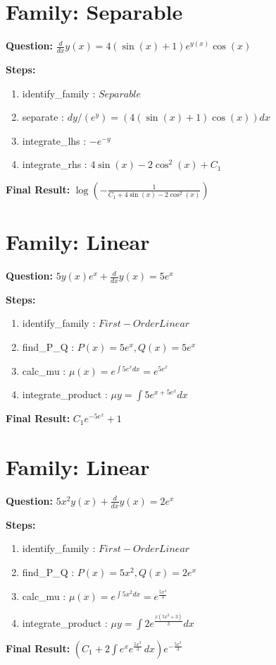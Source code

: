 \documentclass{article}
\begin{document}
\section*{Family: Separable}
\textbf{Question:} $\frac{d}{d x} y{\left(x \right)} = 4 \left(\sin{\left(x \right)} + 1\right) e^{y{\left(x \right)}} \cos{\left(x \right)}$

\textbf{Steps:}
\begin{enumerate}
\item identify_family :  $Separable$
\item separate :  $dy / (e^{y}) = (4 \left(\sin{\left(x \right)} + 1\right) \cos{\left(x \right)}) dx$
\item integrate_lhs :  $- e^{- y}$
\item integrate_rhs :  $4 \sin{\left(x \right)} - 2 \cos^{2}{\left(x \right)} + C_1$
\end{enumerate}
\textbf{Final Result:} $\log{\left(- \frac{1}{C_{1} + 4 \sin{\left(x \right)} - 2 \cos^{2}{\left(x \right)}} \right)}$

\section*{Family: Linear}
\textbf{Question:} $5 y{\left(x \right)} e^{x} + \frac{d}{d x} y{\left(x \right)} = 5 e^{x}$

\textbf{Steps:}
\begin{enumerate}
\item identify_family :  $First-Order Linear$
\item find_P_Q :  $P(x)=5 e^{x}, Q(x)=5 e^{x}$
\item calc_mu :  $\mu(x) = e^{\int 5 e^{x} dx} = e^{5 e^{x}}$
\item integrate_product :  $\mu y = \int 5 e^{x + 5 e^{x}} dx$
\end{enumerate}
\textbf{Final Result:} $C_{1} e^{- 5 e^{x}} + 1$

\section*{Family: Linear}
\textbf{Question:} $5 x^{2} y{\left(x \right)} + \frac{d}{d x} y{\left(x \right)} = 2 e^{x}$

\textbf{Steps:}
\begin{enumerate}
\item identify_family :  $First-Order Linear$
\item find_P_Q :  $P(x)=5 x^{2}, Q(x)=2 e^{x}$
\item calc_mu :  $\mu(x) = e^{\int 5 x^{2} dx} = e^{\frac{5 x^{3}}{3}}$
\item integrate_product :  $\mu y = \int 2 e^{\frac{x \left(5 x^{2} + 3\right)}{3}} dx$
\end{enumerate}
\textbf{Final Result:} $\left(C_{1} + 2 \int e^{x} e^{\frac{5 x^{3}}{3}}\, dx\right) e^{- \frac{5 x^{3}}{3}}$
\end{document}
